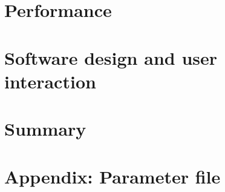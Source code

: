 \documentclass[%
 aip,
superscriptaddress,
 amsmath,amssymb,
preprint,%
]{revtex4-2}
\begin{document}
\section{\label{sec:level5}Performance}



\section{\label{sec:level6}Software design and user interaction}







\section{\label{sec:level7}Summary}


\section{Appendix: Parameter file}




\end{document}
